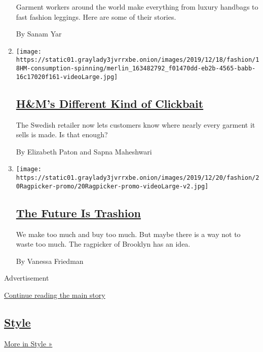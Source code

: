 \begin{enumerate}
  Garment workers around the world make everything from luxury handbags
  to fast fashion leggings. Here are some of their stories.

  By Sanam Yar
\item
  \texttt{[image: https://static01.graylady3jvrrxbe.onion/images/2019/12/18/fashion/18HM-consumption-spinning/merlin\_163482792\_f01470dd-eb2b-4565-babb-16c17020f161-videoLarge.jpg]}

  \hypertarget{hms-different-kind-of-clickbait}{%
  \subsection{\texorpdfstring{\href{/2019/12/18/fashion/hms-supply-chain-transparency.html}{H\&M's
  Different Kind of
  Clickbait}}{H\&M's Different Kind of Clickbait}}\label{hms-different-kind-of-clickbait}}

  The Swedish retailer now lets customers know where nearly every
  garment it sells is made. Is that enough?

  By Elizabeth Paton and Sapna Maheshwari
\item
  \texttt{[image: https://static01.graylady3jvrrxbe.onion/images/2019/12/20/fashion/20Ragpicker-promo/20Ragpicker-promo-videoLarge-v2.jpg]}

  \hypertarget{the-future-is-trashion}{%
  \subsection{\texorpdfstring{\href{/2019/12/20/style/zero-waste-daniel-trashion.html}{The
  Future Is
  Trashion}}{The Future Is Trashion}}\label{the-future-is-trashion}}

  We make too much and buy too much. But maybe there is a way not to
  waste too much. The ragpicker of Brooklyn has an idea.

  By Vanessa Friedman
\end{enumerate}

Advertisement

\protect\hyperlink{after-mid3}{Continue reading the main story}

\hypertarget{style-1}{%
\subsection{\texorpdfstring{\href{/section/style}{Style}}{Style}}\label{style-1}}

\href{/section/style}{More in Style »}

